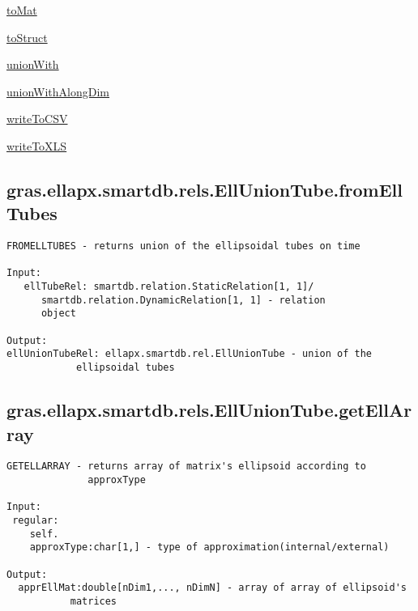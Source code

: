 \begin{list}{}{}
 \item \hyperref[method:smartdb.relations.ATypifiedStaticRelation.toMat]{toMat}
 \item \hyperref[method:smartdb.relations.ATypifiedStaticRelation.toStruct]{toStruct}
 \item \hyperref[method:smartdb.relations.ATypifiedStaticRelation.unionWith]{unionWith}
 \item \hyperref[method:smartdb.relations.ATypifiedStaticRelation.unionWithAlongDim]{unionWithAlongDim}
 \item \hyperref[method:smartdb.relations.ATypifiedStaticRelation.writeToCSV]{writeToCSV}
 \item \hyperref[method:smartdb.relations.ATypifiedStaticRelation.writeToXLS]{writeToXLS}
\end{list}
\subsection{\texorpdfstring{gras.ellapx.smartdb.rels.EllUnionTube.fromEllTubes}{fromEllTubes}}\label{method:gras.ellapx.smartdb.rels.EllUnionTube.fromEllTubes}
\begin{verbatim}
FROMELLTUBES - returns union of the ellipsoidal tubes on time

Input:
   ellTubeRel: smartdb.relation.StaticRelation[1, 1]/
      smartdb.relation.DynamicRelation[1, 1] - relation
      object

Output:
ellUnionTubeRel: ellapx.smartdb.rel.EllUnionTube - union of the
            ellipsoidal tubes
\end{verbatim}
\subsection{\texorpdfstring{gras.ellapx.smartdb.rels.EllUnionTube.getEllArray}{getEllArray}}\label{method:gras.ellapx.smartdb.rels.EllUnionTube.getEllArray}
\begin{verbatim}
GETELLARRAY - returns array of matrix's ellipsoid according to
              approxType

Input:
 regular:
    self.
    approxType:char[1,] - type of approximation(internal/external)

Output:
  apprEllMat:double[nDim1,..., nDimN] - array of array of ellipsoid's
           matrices
\end{verbatim}
